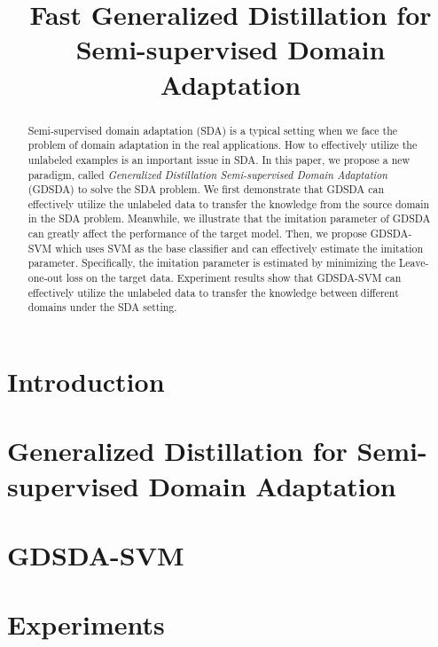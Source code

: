 \documentclass{llncs}
\begin{document}
\title{Fast Generalized Distillation for Semi-supervised Domain Adaptation}
\maketitle
\begin{abstract}
	Semi-supervised domain adaptation (SDA) is a typical setting when we face the problem of domain adaptation in the real applications. How to effectively utilize the unlabeled examples is an important issue in SDA. In this paper, we propose a new paradigm, called \textit{Generalized Distillation Semi-supervised Domain Adaptation} (GDSDA) to solve the SDA problem.
	We first demonstrate that GDSDA can effectively utilize the unlabeled data to transfer the knowledge from the source domain in the SDA problem. Meanwhile, we illustrate that the imitation parameter of GDSDA can greatly affect the performance of the target model. Then, we propose GDSDA-SVM which uses SVM as the base classifier and can effectively estimate the imitation parameter. Specifically, the imitation parameter is estimated by minimizing the Leave-one-out loss on the target data. Experiment results show that GDSDA-SVM can effectively utilize the unlabeled data to transfer the knowledge between different domains under the SDA setting.
\end{abstract}

\section{Introduction}



%

\section{Generalized Distillation for Semi-supervised Domain Adaptation}\label{sec:gdda}



\section{GDSDA-SVM}\label{sec:svm}


\section{Experiments}\label{sec:exp}

\end{document}
